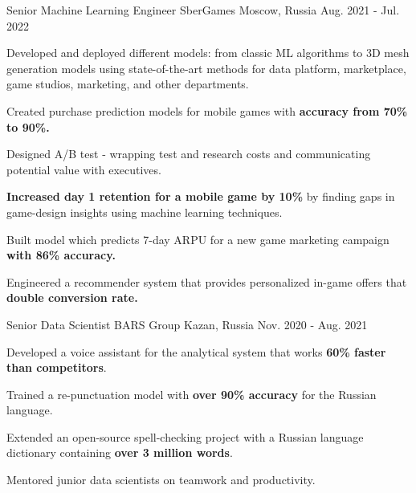 \begin{cventries}
  \cventry
    {Senior Machine Learning Engineer} %
    {SberGames} %
    {Moscow, Russia} %
    {Aug. 2021 - Jul. 2022} %
    {
      \begin{cvitems} %
        \item {Developed and deployed different models: from classic ML algorithms to 3D mesh generation models using state-of-the-art methods for data platform, marketplace, game studios, marketing, and other departments.}
        \item {Created purchase prediction models for mobile games with \textbf{accuracy from 70\% to 90\%.}}
        \item {Designed A/B test - wrapping test and research costs and communicating potential value with executives.}
        \item {\textbf{Increased day 1 retention for a mobile game by 10\%} by finding gaps in game-design insights using machine learning techniques.}
        \item {Built model which predicts 7-day ARPU for a new game marketing campaign \textbf{with 86\% accuracy.}}
        \item {Engineered a recommender system that provides personalized in-game offers that \textbf{double conversion rate.}}
      \end{cvitems}
    }

\cventry
{Senior Data Scientist} %
{BARS Group} %
{Kazan, Russia} %
{Nov. 2020 - Aug. 2021} %
{
  \begin{cvitems} %
    \item {Developed a voice assistant for the analytical system that works \textbf{60\% faster than competitors}.}
    \item {Trained a re-punctuation model with \textbf{over 90\% accuracy} for the Russian language.}
    \item {Extended an open-source spell-checking project with a Russian language dictionary containing \textbf{over 3 million words}.}
    \item {Mentored junior data scientists on teamwork and productivity.}
  \end{cvitems}
}


\end{cventries}
